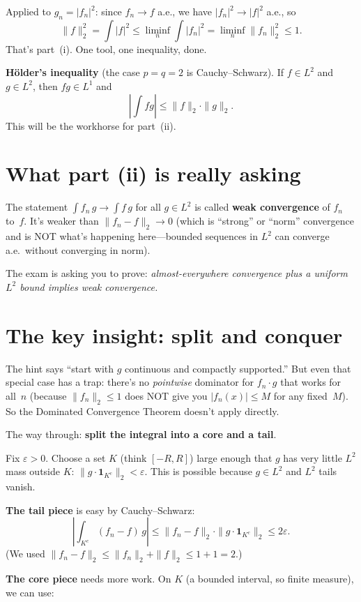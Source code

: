Applied to $g_n = |f_n|^2$: since $f_n \to f$ a.e., we have $|f_n|^2
\to |f|^2$ a.e., so
\[
  \|f\|_2^2 = \int |f|^2 \le \liminf_n \int |f_n|^2
  = \liminf_n \|f_n\|_2^2 \le 1.
\]
That's part~(i). One tool, one inequality, done.

\textbf{H\"older's inequality} (the case $p = q = 2$ is Cauchy--Schwarz).
If $f \in L^2$ and $g \in L^2$, then $fg \in L^1$ and
\[
  \left|\int fg\right| \le \|f\|_2 \cdot \|g\|_2.
\]
This will be the workhorse for part~(ii).

\section{What part (ii) is really asking}

The statement $\int f_n\,g \to \int f\,g$ for all $g \in L^2$ is called
\textbf{weak convergence} of $f_n$ to~$f$. It's weaker than
$\|f_n - f\|_2 \to 0$ (which is ``strong'' or ``norm'' convergence and is
NOT what's happening here---bounded sequences in $L^2$ can converge a.e.\
without converging in norm).

The exam is asking you to prove: \emph{almost-everywhere convergence plus
a uniform $L^2$ bound implies weak convergence.}

\section{The key insight: split and conquer}

The hint says ``start with $g$ continuous and compactly supported.'' But
even that special case has a trap: there's no \emph{pointwise} dominator
for $f_n \cdot g$ that works for all~$n$ (because $\|f_n\|_2 \le 1$
does NOT give you $|f_n(x)| \le M$ for any fixed~$M$). So the Dominated
Convergence Theorem doesn't apply directly.

The way through: \textbf{split the integral into a core and a tail}.

Fix $\varepsilon > 0$. Choose a set $K$ (think $[-R, R]$) large enough
that $g$ has very little $L^2$ mass outside $K$:
$\|g \cdot \mathbf{1}_{K^c}\|_2 < \varepsilon$. This is possible
because $g \in L^2$ and $L^2$ tails vanish.

\textbf{The tail piece} is easy by Cauchy--Schwarz:
\[
  \left|\int_{K^c} (f_n - f)\,g\right|
  \le \|f_n - f\|_2 \cdot \|g \cdot \mathbf{1}_{K^c}\|_2
  \le 2\varepsilon.
\]
(We used $\|f_n - f\|_2 \le \|f_n\|_2 + \|f\|_2 \le 1 + 1 = 2$.)

\textbf{The core piece} needs more work. On $K$ (a bounded interval, so
finite measure), we can use:

